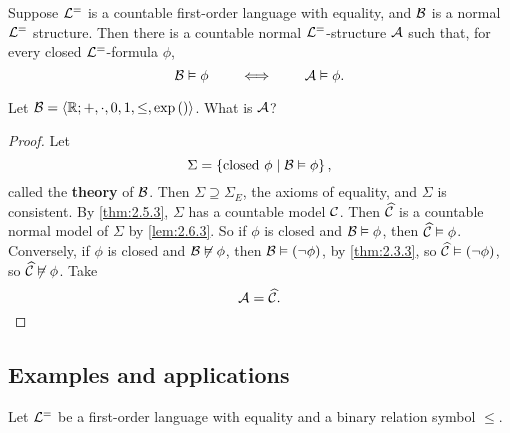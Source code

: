 \begin{theorem}
\label{thm:2.6.6}
Suppose $ \LL^= $ is a countable first-order language with equality, and $ \BB $ is a normal $ \LL^= $ structure. Then there is a countable normal $ \LL^= $-structure $ \AA $ such that, for every closed $ \LL^= $-formula $ \phi $,
$$ \BB \vDash \phi \qquad \iff \qquad \AA \vDash \phi. $$
\end{theorem}

\begin{example*}
Let $ \BB = \ab{\R; +, \cdot, 0, 1, \le, \exp\rb{}} $. What is $ \AA $?
\end{example*}

\begin{proof}
Let
$$ \Sigma = \cb{\text{closed} \ \phi \mid \BB \vDash \phi}, $$
called the \textbf{theory} of $ \BB $. Then $ \Sigma \supseteq \Sigma_E $, the axioms of equality, and $ \Sigma $ is consistent. By \ref{thm:2.5.3}, $ \Sigma $ has a countable model $ \CC $. Then $ \widehat{\CC} $ is a countable normal model of $ \Sigma $ by \ref{lem:2.6.3}. So if $ \phi $ is closed and $ \BB \vDash \phi $, then $ \widehat{\CC} \vDash \phi $. Conversely, if $ \phi $ is closed and $ \BB \not\vDash \phi $, then $ \BB \vDash \notb{\phi} $, by \ref{thm:2.3.3}, so $ \widehat{\CC} \vDash \notb{\phi} $, so $ \widehat{\CC} \not\vDash \phi $. Take
$$ \AA = \widehat{\CC}. $$
\end{proof}

\subsection{Examples and applications}

Let $ \LL^= $ be a first-order language with equality and a binary relation symbol $ \le $.

